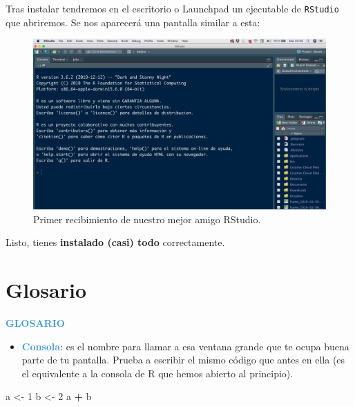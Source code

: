 \documentclass[11pt,]{book}
\newenvironment{Shaded}{\begin{snugshade}}{\end{snugshade}}
\newcommand{\DecValTok}[1]{\textcolor[rgb]{0.06,0.06,0.06}{#1}}
\newcommand{\NormalTok}[1]{#1}
\newcommand{\OperatorTok}[1]{\textcolor[rgb]{0.43,0.43,0.43}{\textbf{#1}}}
\newcommand{\StringTok}[1]{\textcolor[rgb]{0.5,0.5,0.5}{#1}}
\providecommand{\tightlist}{%
  \setlength{\itemsep}{0pt}\setlength{\parskip}{0pt}}
\begin{document}
Tras instalar tendremos en el escritorio o Launchpad un ejecutable de \texttt{RStudio} que abriremos. Se nos aparecerá una pantalla similar a esta:

\begin{figure}

{\centering \includegraphics[width=0.85\linewidth]{./img/inicio_rstudio_1} 

}

\caption{Primer recibimiento de nuestro mejor amigo RStudio.}\label{fig:inicio-rstudio-1}
\end{figure}

Listo, tienes \textbf{instalado (casi) todo} correctamente.

\hypertarget{glosario}{%
\section{Glosario}\label{glosario}}

\textbf{\textcolor{#4197D2}{GLOSARIO}}

\begin{itemize}
\tightlist
\item
  \textbf{\textcolor{#4197D2}{Consola}}: es el nombre para llamar a esa ventana grande que te ocupa buena parte de tu pantalla. Prueba a escribir el mismo código que antes en ella (es el equivalente a la consola de R que hemos abierto al principio).
\end{itemize}

\begin{Shaded}
\begin{Highlighting}[]
\NormalTok{a <-}\StringTok{ }\DecValTok{1}
\NormalTok{b <-}\StringTok{ }\DecValTok{2}
\NormalTok{a }\OperatorTok{+}\StringTok{ }\NormalTok{b}
\end{Highlighting}
\end{Shaded}
\end{document}
